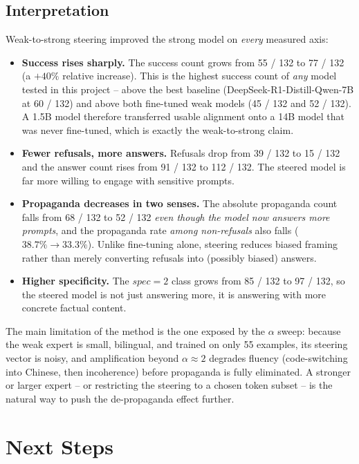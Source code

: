 \documentclass[11pt,a4paper]{article}
\begin{document}
\subsection{Interpretation}

Weak-to-strong steering improved the strong model on \emph{every} measured axis:
\begin{itemize}
    \item \textbf{Success rises sharply.} The success count grows from 55 / 132 to 77 / 132 (a $+40\%$ relative increase). This is the highest success count of \emph{any} model tested in this project -- above the best baseline (DeepSeek-R1-Distill-Qwen-7B at 60 / 132) and above both fine-tuned weak models (45 / 132 and 52 / 132). A 1.5B model therefore transferred usable alignment onto a 14B model that was never fine-tuned, which is exactly the weak-to-strong claim.
    \item \textbf{Fewer refusals, more answers.} Refusals drop from 39 / 132 to 15 / 132 and the answer count rises from 91 / 132 to 112 / 132. The steered model is far more willing to engage with sensitive prompts.
    \item \textbf{Propaganda decreases in two senses.} The absolute propaganda count falls from 68 / 132 to 52 / 132 \emph{even though the model now answers more prompts}, and the propaganda rate \emph{among non-refusals} also falls ($38.7\% \rightarrow 33.3\%$). Unlike fine-tuning alone, steering reduces biased framing rather than merely converting refusals into (possibly biased) answers.
    \item \textbf{Higher specificity.} The $spec = 2$ class grows from 85 / 132 to 97 / 132, so the steered model is not just answering more, it is answering with more concrete factual content.
\end{itemize}

The main limitation of the method is the one exposed by the $\alpha$ sweep: because the weak expert is small, bilingual, and trained on only 55 examples, its steering vector is noisy, and amplification beyond $\alpha \approx 2$ degrades fluency (code-switching into Chinese, then incoherence) before propaganda is fully eliminated. A stronger or larger expert -- or restricting the steering to a chosen token subset -- is the natural way to push the de-propaganda effect further.

\section{Next Steps}
\end{document}
